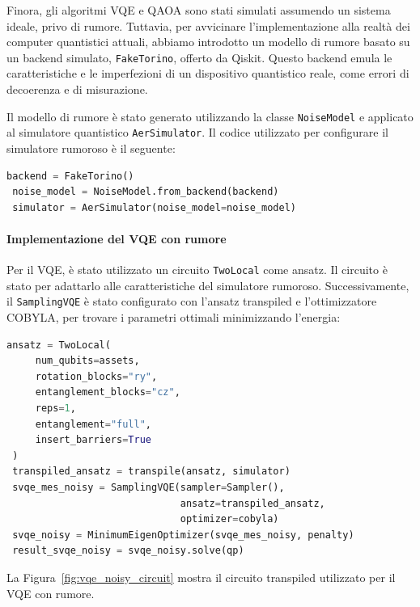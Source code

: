 Finora, gli algoritmi VQE e QAOA sono stati simulati assumendo un sistema ideale, 
privo di rumore. Tuttavia, per avvicinare l'implementazione alla realtà dei computer 
quantistici attuali, abbiamo introdotto un modello di rumore basato su un backend 
simulato, \texttt{FakeTorino}, offerto da Qiskit. Questo backend emula le 
caratteristiche e le imperfezioni di un dispositivo quantistico reale, come errori 
di decoerenza e di misurazione.


Il modello di rumore è stato generato utilizzando la classe \texttt{NoiseModel} 
e applicato al simulatore quantistico \texttt{AerSimulator}. Il codice utilizzato 
per configurare il simulatore rumoroso è il seguente:

\begin{lstlisting}[language=python, caption={\mmerenda{todo}}]
 backend = FakeTorino()
 noise_model = NoiseModel.from_backend(backend)
 simulator = AerSimulator(noise_model=noise_model)
\end{lstlisting}

\paragraph{Implementazione del VQE con rumore} 
Per il VQE, è stato utilizzato un circuito \texttt{TwoLocal} come ansatz. Il 
circuito è stato  per adattarlo alle caratteristiche del simulatore 
rumoroso. Successivamente, il \texttt{SamplingVQE} è stato configurato con 
l'ansatz transpiled e l'ottimizzatore COBYLA, per trovare i parametri ottimali 
minimizzando l'energia:

\begin{lstlisting}[language=python, caption={\mmerenda{todo}}]
 ansatz = TwoLocal(
     num_qubits=assets,
     rotation_blocks="ry",
     entanglement_blocks="cz",
     reps=1,
     entanglement="full",
     insert_barriers=True
 )
 transpiled_ansatz = transpile(ansatz, simulator)
 svqe_mes_noisy = SamplingVQE(sampler=Sampler(), 
                              ansatz=transpiled_ansatz, 
                              optimizer=cobyla)
 svqe_noisy = MinimumEigenOptimizer(svqe_mes_noisy, penalty)
 result_svqe_noisy = svqe_noisy.solve(qp)
\end{lstlisting}

La Figura~\ref{fig:vqe_noisy_circuit} mostra il circuito transpiled utilizzato per il 
VQE con rumore.

